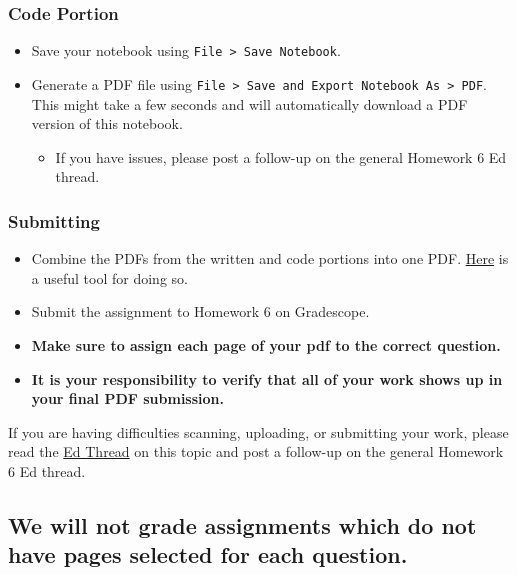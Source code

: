 \documentclass[11pt]{article}
\makeatletter
\providecommand{\tightlist}{%
      \setlength{\itemsep}{0pt}\setlength{\parskip}{0pt}}
\newcommand{\boxspacing}{\kern\kvtcb@left@rule\kern\kvtcb@boxsep}
\newcommand{\prompt}[4]{
        {\ttfamily\llap{{\color{#2}[#3]:\hspace{3pt}#4}}\vspace{-\baselineskip}}
    }
\makeatother
\begin{document}
\subsubsection{Code Portion}\label{code-portion}

\begin{itemize}
\tightlist
\item
  Save your notebook using
  \texttt{File\ \textgreater{}\ Save\ Notebook}.
\item
  Generate a PDF file using
  \texttt{File\ \textgreater{}\ Save\ and\ Export\ Notebook\ As\ \textgreater{}\ PDF}.
  This might take a few seconds and will automatically download a PDF
  version of this notebook.

  \begin{itemize}
  \tightlist
  \item
    If you have issues, please post a follow-up on the general Homework
    6 Ed thread.
  \end{itemize}
\end{itemize}

\subsubsection{Submitting}\label{submitting}

\begin{itemize}
\tightlist
\item
  Combine the PDFs from the written and code portions into one PDF.
  \href{https://smallpdf.com/merge-pdf}{Here} is a useful tool for doing
  so.
\item
  Submit the assignment to Homework 6 on Gradescope.
\item
  \textbf{Make sure to assign each page of your pdf to the correct
  question.}
\item
  \textbf{It is your responsibility to verify that all of your work
  shows up in your final PDF submission.}
\end{itemize}

If you are having difficulties scanning, uploading, or submitting your
work, please read the
\href{https://edstem.org/us/courses/94054/discussion/7533569}{Ed Thread}
on this topic and post a follow-up on the general Homework 6 Ed thread.

    \subsection{\texorpdfstring{\textbf{We will not grade assignments which
do not have pages selected for each
question.}}{We will not grade assignments which do not have pages selected for each question.}}\label{we-will-not-grade-assignments-which-do-not-have-pages-selected-for-each-question.}

    \begin{tcolorbox}[breakable, size=fbox, boxrule=1pt, pad at break*=1mm,colback=cellbackground, colframe=cellborder]
\prompt{In}{incolor}{ }{\boxspacing}
\begin{Verbatim}[commandchars=\\\{\}]

\end{Verbatim}
\end{tcolorbox}


    
    
    
\end{document}
